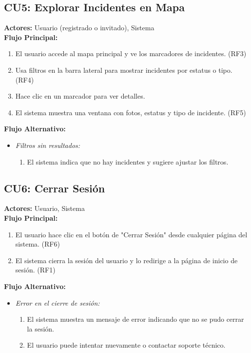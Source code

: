 \subsection*{CU5: Explorar Incidentes en Mapa}
\textbf{Actores:} Usuario (registrado o invitado), Sistema\\
\textbf{Flujo Principal:}
\begin{enumerate}
    \item El usuario accede al mapa principal y ve los marcadores de incidentes. (RF3)
    \item Usa filtros en la barra lateral para mostrar incidentes por estatus o tipo. (RF4)
    \item Hace clic en un marcador para ver detalles.
    \item El sistema muestra una ventana con fotos, estatus y tipo de incidente. (RF5)
\end{enumerate}
\textbf{Flujo Alternativo:}
\begin{itemize}
    \item \textit{Filtros sin resultados:}
    \begin{enumerate}
        \item El sistema indica que no hay incidentes y sugiere ajustar los filtros.
    \end{enumerate}
\end{itemize}

\subsection*{CU6: Cerrar Sesión}
\textbf{Actores:} Usuario, Sistema\\
\textbf{Flujo Principal:}
\begin{enumerate}
    \item El usuario hace clic en el botón de "Cerrar Sesión" desde cualquier página del sistema. (RF6)
    \item El sistema cierra la sesión del usuario y lo redirige a la página de inicio de sesión. (RF1)
\end{enumerate}
\textbf{Flujo Alternativo:}
\begin{itemize}
    \item \textit{Error en el cierre de sesión:}
    \begin{enumerate}
        \item El sistema muestra un mensaje de error indicando que no se pudo cerrar la sesión.
        \item El usuario puede intentar nuevamente o contactar soporte técnico.
    \end{enumerate}
\end{itemize}

